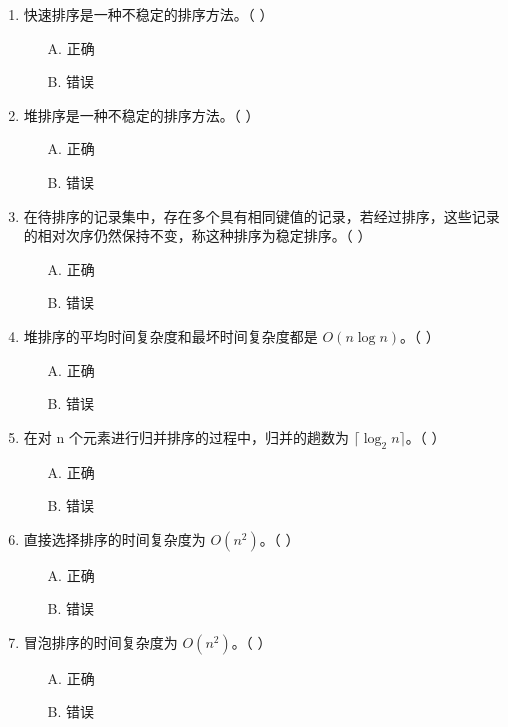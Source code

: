 \documentclass[12pt, a4paper]{article}
\begin{document}
\begin{enumerate}[label=\arabic*.]
	\item 快速排序是一种不稳定的排序方法。（ ）
	      \begin{enumerate}
		      \item[A.] 正确
		      \item[B.] 错误
	      \end{enumerate}

	\item 堆排序是一种不稳定的排序方法。（ ）
	      \begin{enumerate}
		      \item[A.] 正确
		      \item[B.] 错误
	      \end{enumerate}

	\item 在待排序的记录集中，存在多个具有相同键值的记录，若经过排序，这些记录的相对次序仍然保持不变，称这种排序为稳定排序。（ ）
	      \begin{enumerate}
		      \item[A.] 正确
		      \item[B.] 错误
	      \end{enumerate}

	\item 堆排序的平均时间复杂度和最坏时间复杂度都是 $O(n \log n)$。（ ）
	      \begin{enumerate}
		      \item[A.] 正确
		      \item[B.] 错误
	      \end{enumerate}

	\item 在对 n 个元素进行归并排序的过程中，归并的趟数为 $\lceil \log_2 n \rceil$。（ ）
	      \begin{enumerate}
		      \item[A.] 正确
		      \item[B.] 错误
	      \end{enumerate}

	\item 直接选择排序的时间复杂度为 $O(n^2)$。（ ）
	      \begin{enumerate}
		      \item[A.] 正确
		      \item[B.] 错误
	      \end{enumerate}

	\item 冒泡排序的时间复杂度为 $O(n^2)$。（ ）
	      \begin{enumerate}
		      \item[A.] 正确
		      \item[B.] 错误
	      \end{enumerate}


\end{enumerate}
\end{document}
